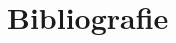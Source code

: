 \documentclass[a4paper]{report}
\begin{document}
\chapter{Bibliografie}
\begingroup
\renewcommand{\chapter}[2]{} %
\renewcommand{\addcontentsline}[3]{} %


\endgroup

\end{document}
